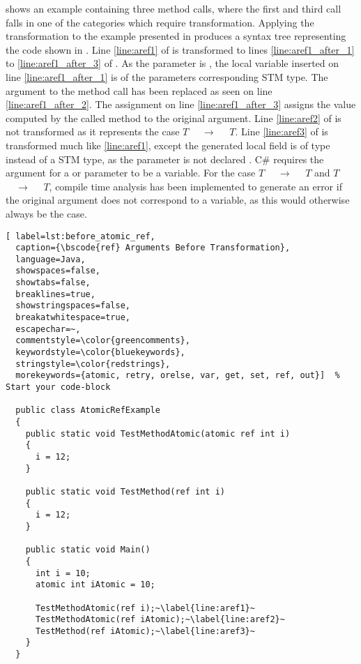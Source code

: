  shows an example containing three method calls, where the first and third call falls in one of the categories which require transformation. Applying the transformation to the example presented in  produces a syntax tree representing the code shown in . Line \ref{line:aref1} of  is transformed to lines \ref{line:aref1_after_1} to \ref{line:aref1_after_3} of . As the parameter is , the local variable inserted on line \ref{line:aref1_after_1} is of the parameters corresponding \ac{STM} type. The argument to the method call has been replaced as seen on line \ref{line:aref1_after_2}. The assignment on line \ref{line:aref1_after_3} assigns the value computed by the called method to the original argument. Line \ref{line:aref2} of  is not transformed as it represents the case  $T$ $\quad \rightarrow \quad$  $T$. Line \ref{line:aref3} of  is transformed much like \ref{line:aref1}, except the generated local field is of type  instead of a \ac{STM} type, as the parameter is not declared . C\# requires the argument for a  or  parameter to be a variable. For the case $T$ $\quad \rightarrow \quad$  $T$ and  $T$ $\quad \rightarrow \quad$ $T$,  compile time analysis has been implemented to generate an error if the original argument does not correspond to a variable, as this would otherwise always be the case.


\begin{lstlisting}[ label=lst:before_atomic_ref,
  caption={\bscode{ref} Arguments Before Transformation},
  language=Java,  
  showspaces=false,
  showtabs=false,
  breaklines=true,
  showstringspaces=false,
  breakatwhitespace=true,
  escapechar=~,
  commentstyle=\color{greencomments},
  keywordstyle=\color{bluekeywords},
  stringstyle=\color{redstrings},
  morekeywords={atomic, retry, orelse, var, get, set, ref, out}]  % Start your code-block

  public class AtomicRefExample
  {
    public static void TestMethodAtomic(atomic ref int i)
    {
      i = 12;
    }

    public static void TestMethod(ref int i)
    {
      i = 12;
    }

    public static void Main()
    {
      int i = 10;
      atomic int iAtomic = 10;

      TestMethodAtomic(ref i);~\label{line:aref1}~
      TestMethodAtomic(ref iAtomic);~\label{line:aref2}~
      TestMethod(ref iAtomic);~\label{line:aref3}~
    }
  }
\end{lstlisting}

